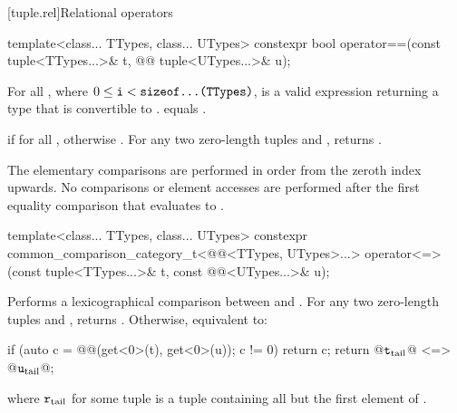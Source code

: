 \documentclass{wg21}
\begin{document}
[tuple.rel]{Relational operators}

\begin{itemdecl}
template<class... TTypes, class... UTypes>
constexpr bool operator==(const tuple<TTypes...>& t, @@ tuple<UTypes...>& u);
\end{itemdecl}

\begin{itemdescr}
    \pnum
    \mandates
    For all ,
    where $0 \leq \texttt{i} < \texttt{sizeof...(TTypes)}$,
     is a valid expression
    returning a type that is convertible to .
     equals
    .
    
    \pnum
    \returns
     if  for all
    , otherwise .
    For any two zero-length tuples  and ,  returns .
    
    \pnum
    \effects
    The elementary comparisons are performed in order from the
    zeroth index upwards.  No comparisons or element accesses are
    performed after the first equality comparison that evaluates to
    .
\end{itemdescr}

%
\begin{itemdecl}
template<class... TTypes, class... UTypes>
constexpr common_comparison_category_t<@@<TTypes, UTypes>...>
operator<=>(const tuple<TTypes...>& t, const @@<UTypes...>& u);
\end{itemdecl}

\begin{itemdescr}
    \pnum
    \effects
    Performs a lexicographical comparison between  and .
    For any two zero-length tuples  and ,
     returns .
    Otherwise, equivalent to:
    \begin{codeblock}
        if (auto c = @@(get<0>(t), get<0>(u)); c != 0) return c;
        return @$\texttt{t}_\mathrm{tail}$@ <=> @$\texttt{u}_\mathrm{tail}$@;
    \end{codeblock}
    where $\texttt{r}_\mathrm{tail}$ for some tuple 
    is a tuple containing all but the first element of .
\end{itemdescr}
\end{document}
